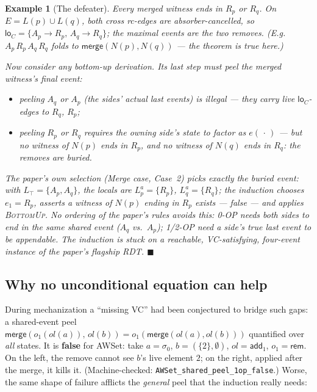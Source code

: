 \documentclass[11pt]{article}
\newtheorem{example}[theorem]{Example}
\newcommand{\add}{\mathsf{add}}
\newcommand{\rem}{\mathsf{rem}}
\newcommand{\Merge}{\mathsf{merge}}
\newcommand{\Sinit}{\sigma_0}
\newcommand{\lean}[1]{\texttt{#1}}
\begin{document}
\begin{example}[The defeater]
\emph{Every merged witness ends in $R_p$ or $R_q$.} On
$E = L(p) \cup L(q)$, both cross rc-edges are absorber-cancelled, so
$\mathsf{lo}_C = \{A_p \to R_p,\, A_q \to R_q\}$; the maximal events are
the two removes. (E.g.\ $A_p\,R_p\,A_q\,R_q$ folds to
$\Merge(N(p),N(q))$ --- the theorem is \emph{true} here.)

Now consider any bottom-up derivation. Its last step must peel the merged
witness's final event:
\begin{itemize}[leftmargin=2em]
\item peeling $A_q$ or $A_p$ (the sides' actual last events) is illegal
--- they carry live $\mathsf{lo}_C$-edges to $R_q$, $R_p$;
\item peeling $R_p$ or $R_q$ requires the owning side's state to factor
as $e(\,\cdot\,)$ --- but \emph{no} witness of $N(p)$ ends in $R_p$, and
no witness of $N(q)$ ends in $R_q$: the removes are \emph{buried}.
\end{itemize}
The paper's own selection (Merge case, Case~2) picks exactly the buried
event: with $L_\top = \{A_p, A_q\}$, the locals are
$L^a_p = \{R_p\}$, $L^a_q = \{R_q\}$; the induction chooses
$e_1 = R_p$, asserts a witness of $N(p)$ ending in $R_p$ exists ---
false --- and applies \textsc{BottomUp}. \emph{No ordering of the
paper's rules avoids this}: 0-OP needs both sides to end in the same
shared event ($A_q$ vs.\ $A_p$); 1/2-OP need a side's true last event to
be appendable. The induction is stuck on a reachable, VC-satisfying,
four-event instance of the paper's flagship RDT. \hfill$\blacksquare$
\end{example}

\subsection{Why no unconditional equation can help}

During mechanization a ``missing VC'' had been conjectured to bridge such
gaps: a shared-event peel
$\Merge(o_1(\mathit{ol}(a)),\, \mathit{ol}(b)) =
o_1(\Merge(\mathit{ol}(a), \mathit{ol}(b)))$
quantified over \emph{all} states. It is \textbf{false} for
\textsf{AWSet}: take $a = \Sinit$, $b = (\{2\},\emptyset)$,
$\mathit{ol} = \add_1$, $o_1 = \rem$. On the left, the remove cannot see
$b$'s live element $2$; on the right, applied after the merge, it kills
it. (Machine-checked: \lean{AWSet\_shared\_peel\_1op\_false}.) Worse, the
same shape of failure afflicts the \emph{general} peel that the induction
really needs:
\end{document}
